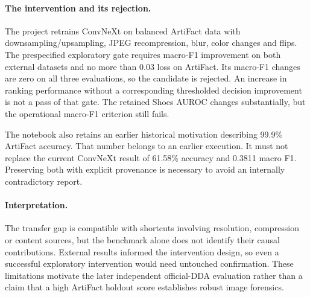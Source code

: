 \paragraph{The intervention and its rejection.} The project retrains ConvNeXt on balanced ArtiFact data with downsampling/upsampling, JPEG recompression, blur, color changes and flips. The prespecified exploratory gate requires macro-F1 improvement on both external datasets and no more than 0.03 loss on ArtiFact. Its macro-F1 changes are zero on all three evaluations, so the candidate is rejected. An increase in ranking performance without a corresponding thresholded decision improvement is not a pass of that gate. The retained Shoes AUROC changes substantially, but the operational macro-F1 criterion still fails.

The notebook also retains an earlier historical motivation describing 99.9\% ArtiFact accuracy. That number belongs to an earlier execution. It must not replace the current ConvNeXt result of 61.58\% accuracy and 0.3811 macro F1. Preserving both with explicit provenance is necessary to avoid an internally contradictory report.

\paragraph{Interpretation.} The transfer gap is compatible with shortcuts involving resolution, compression or content sources, but the benchmark alone does not identify their causal contributions. External results informed the intervention design, so even a successful exploratory intervention would need untouched confirmation. These limitations motivate the later independent official-DDA evaluation rather than a claim that a high ArtiFact holdout score establishes robust image forensics.
